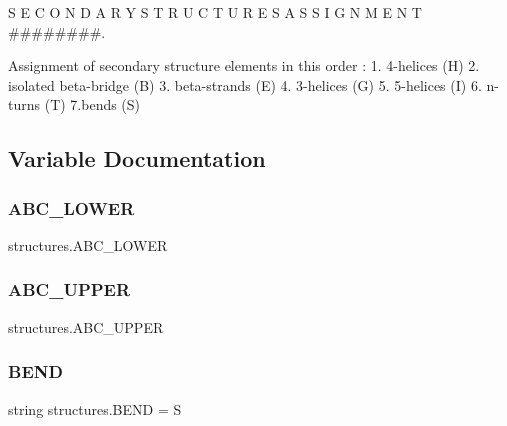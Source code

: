S E C O N D A R Y S T R U C T U R E S A S S I G N M E N T \#\#\#\#\#\#\#\#. 

\begin{DoxyVerb}Assignment of secondary structure elements in this order :
    1. 4-helices (H)
    2. isolated beta-bridge (B)
    3. beta-strands (E)
    4. 3-helices (G)
    5. 5-helices (I)
    6. n-turns (T)
    7.bends (S)\end{DoxyVerb}
 

\subsection{Variable Documentation}
\mbox{\label{namespacestructures_a2fb8c4a860481d31cb40cb025dd32509}} 
\subsubsection{\texorpdfstring{A\+B\+C\+\_\+\+L\+O\+W\+ER}{ABC\_LOWER}}
{\footnotesize\ttfamily structures.\+A\+B\+C\+\_\+\+L\+O\+W\+ER}

\mbox{\label{namespacestructures_a7e2219fe0135af5a4fd1b183d996feb5}} 
\subsubsection{\texorpdfstring{A\+B\+C\+\_\+\+U\+P\+P\+ER}{ABC\_UPPER}}
{\footnotesize\ttfamily structures.\+A\+B\+C\+\_\+\+U\+P\+P\+ER}

\mbox{\label{namespacestructures_a923fa27377e5faf86a855f551b60a06b}} 
\subsubsection{\texorpdfstring{B\+E\+ND}{BEND}}
{\footnotesize\ttfamily string structures.\+B\+E\+ND = \textquotesingle{}S\textquotesingle{}}

\mbox{\label{namespacestructures_ad49df5841966bdbd70cc0dbc3d477a9b}} 
